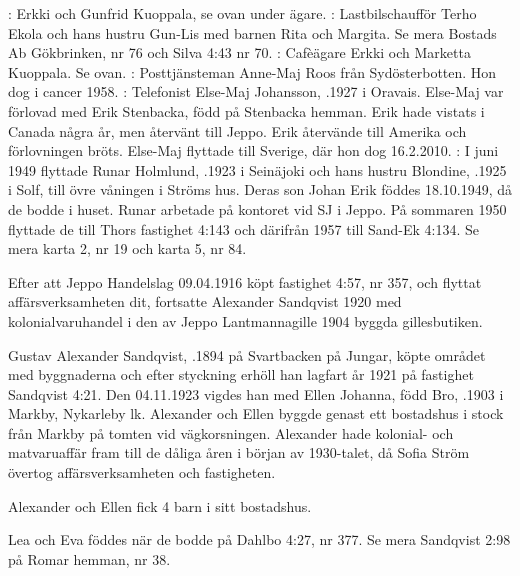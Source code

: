 
:  Erkki och Gunfrid Kuoppala, se ovan under ägare.
:  Lastbilschaufför Terho Ekola och hans hustru Gun-Lis med barnen Rita och Margita. Se mera Bostads Ab Gökbrinken, nr 76 och Silva 4:43 nr 70.
:  Cafèägare Erkki och Marketta Kuoppala. Se ovan.
:  Posttjänsteman Anne-Maj Roos från Sydösterbotten. Hon dog i cancer 1958.
:  Telefonist Else-Maj Johansson, .1927 i Oravais. Else-Maj var förlovad med Erik Stenbacka, född på Stenbacka hemman. Erik hade vistats i Canada några år, men återvänt till Jeppo. Erik återvände till Amerika och förlovningen bröts. Else-Maj flyttade till Sverige, där hon dog 16.2.2010.
:  I juni 1949 flyttade Runar Holmlund, .1923 i Seinäjoki och hans hustru Blondine, .1925 i Solf, till övre våningen i Ströms hus. Deras son Johan Erik föddes 18.10.1949, då de bodde i huset. Runar arbetade på kontoret vid SJ i Jeppo. På sommaren 1950 flyttade de till Thors fastighet 4:143 och därifrån 1957 till Sand-Ek 4:134. Se mera karta 2, nr 19 och karta 5, nr 84.


Efter att Jeppo Handelslag 09.04.1916 köpt fastighet 4:57, nr	357, och flyttat affärsverksamheten dit, fortsatte Alexander Sandqvist	1920 med kolonialvaruhandel i den av Jeppo Lantmannagille 1904 byggda gillesbutiken.

Gustav Alexander Sandqvist, .1894 på Svartbacken på	Jungar, köpte området med byggnaderna och efter styckning	erhöll han lagfart år 1921 på fastighet Sandqvist 4:21. Den 04.11.1923 vigdes han med Ellen Johanna, född Bro, .1903 i Markby, Nykarleby lk. 	Alexander och Ellen byggde genast ett bostadshus i stock från Markby på 	tomten vid vägkorsningen. Alexander hade kolonial- och matvaruaffär fram till de 	dåliga åren i början av 1930-talet, då Sofia Ström övertog	affärsverksamheten och fastigheten.

Alexander och Ellen fick 4 barn i sitt bostadshus.
\begin{jhchildren}
  \item {}
  \item {}
  \item {}
  \item {}
\end{jhchildren}
Lea och Eva föddes när de bodde på Dahlbo 4:27, nr 377. Se mera Sandqvist 2:98 på Romar hemman, nr 38.

